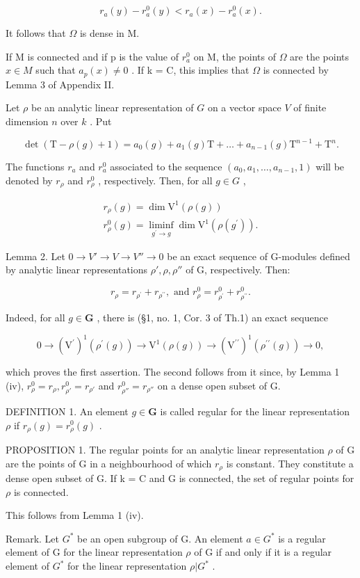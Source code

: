 \[
r _ {a} (y) - r _ {a} ^ {0} (y) <   r _ {a} (x) - r _ {a} ^ {0} (x).
\]

It follows that \(\Omega\) is dense in M.

If M is connected and if p is the value of \(r_{a}^{0}\) on M, the points of \(\Omega\) are the points \(x \in M\) such that \(a_{p}(x) \neq 0\) . If k = C, this implies that \(\Omega\) is connected by Lemma 3 of Appendix II.

Let \(\rho\) be an analytic linear representation of \(G\) on a vector space \(V\) of finite dimension \(n\) over \(k\) . Put

\[
\det (\mathrm{T} - \rho (g) + 1) = a _ {0} (g) + a _ {1} (g) \mathrm{T} + \dots + a _ {n - 1} (g) \mathrm{T} ^ {n - 1} + \mathrm{T} ^ {n}.
\]

The functions \(r_a\) and \(r_a^0\) associated to the sequence \((a_0, a_1, \ldots, a_{n-1}, 1)\) will be denoted by \(r_\rho\) and \(r_\rho^0\) , respectively. Then, for all \(g \in G\) ,

\[
\begin{array}{l} r _ {\rho} (g) = \dim \mathrm{V} ^ {1} (\rho (g)) \\ r _ {\rho} ^ {0} (g) = \liminf _ {g ^ {\prime} \to g} \dim \mathrm{V} ^ {1} (\rho (g ^ {\prime})). \end{array}
\]

Lemma 2. Let \(0 \to V' \to V \to V'' \to 0\) be an exact sequence of G-modules defined by analytic linear representations \(\rho', \rho, \rho''\) of G, respectively. Then:

\[
r _ {\rho} = r _ {\rho^ {\prime}} + r _ {\rho^ {\prime \prime}}, \text { and } r _ {\rho} ^ {0} = r _ {\rho^ {\prime}} ^ {0} + r _ {\rho^ {\prime \prime}} ^ {0}.
\]

Indeed, for all \(g \in \mathbf{G}\) , there is (§1, no. 1, Cor. 3 of Th.1) an exact sequence

\[
0 \to (\mathrm{V} ^ {\prime}) ^ {1} (\rho^ {\prime} (g)) \to \mathrm{V} ^ {1} (\rho (g)) \to (\mathrm{V} ^ {\prime \prime}) ^ {1} (\rho^ {\prime \prime} (g)) \to 0,
\]

which proves the first assertion. The second follows from it since, by Lemma 1 (iv), \(r_{\rho}^{0} = r_{\rho}, r_{\rho'}^{0} = r_{\rho'}\) and \(r_{\rho''}^{0} = r_{\rho''}\) on a dense open subset of G.

DEFINITION 1. An element \(g \in \mathbf{G}\) is called regular for the linear representation \(\rho\) if \(r_{\rho}(g) = r_{\rho}^{0}(g)\) .

PROPOSITION 1. The regular points for an analytic linear representation \(\rho\) of G are the points of G in a neighbourhood of which \(r_{\rho}\) is constant. They constitute a dense open subset of G. If k = C and G is connected, the set of regular points for \(\rho\) is connected.

This follows from Lemma 1 (iv).

Remark. Let \(G^{*}\) be an open subgroup of G. An element \(a \in G^{*}\) is a regular element of G for the linear representation \(\rho\) of G if and only if it is a regular element of \(G^{*}\) for the linear representation \(\rho|G^{*}\) .

